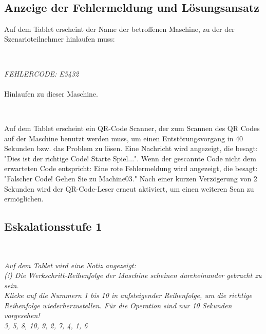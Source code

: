 \

\subsection*{Anzeige der Fehlermeldung und Lösungsansatz}

\hspace{0pt} Auf dem Tablet erscheint der Name der betroffenen Maschine, zu der der Szenarioteilnehmer hinlaufen muss:

\

\emph{FEHLERCODE: E5432}\\
\\

Hinlaufen zu dieser Maschine. \hspace{0pt}



\




\hspace{0pt}Auf dem Tablet erscheint ein QR-Code Scanner, der zum Scannen des QR Codes auf der Maschine benutzt werden muss, um einen Entstörungsvorgang in 40 Sekunden bzw. das Problem zu lösen. Eine Nachricht wird angezeigt, die besagt: "Dies ist der richtige Code! Starte Spiel...".
Wenn der gescannte Code nicht dem erwarteten Code entspricht: Eine rote Fehlermeldung wird angezeigt, die besagt: "Falscher Code! Gehen Sie zu Machine03." Nach einer kurzen Verzögerung von 2 Sekunden wird der QR-Code-Leser erneut aktiviert, um einen weiteren Scan zu ermöglichen.
\


\subsection*{Eskalationsstufe 1}

\

\emph{Auf dem Tablet wird eine Notiz angezeigt:} \\
\emph{(!) Die Werkschritt-Reihenfolge der Maschine scheinen durcheinander gebracht zu sein. } \\

\emph{Klicke auf die Nummern 1 bis 10 in aufsteigender Reihenfolge, um die richtige Reihenfolge wiederherzustellen. Für die Operation sind nur 10 Sekunden vorgesehen!} \\

\emph{3, 5, 8, 10, 9, 2, 7, 4, 1, 6} \\

